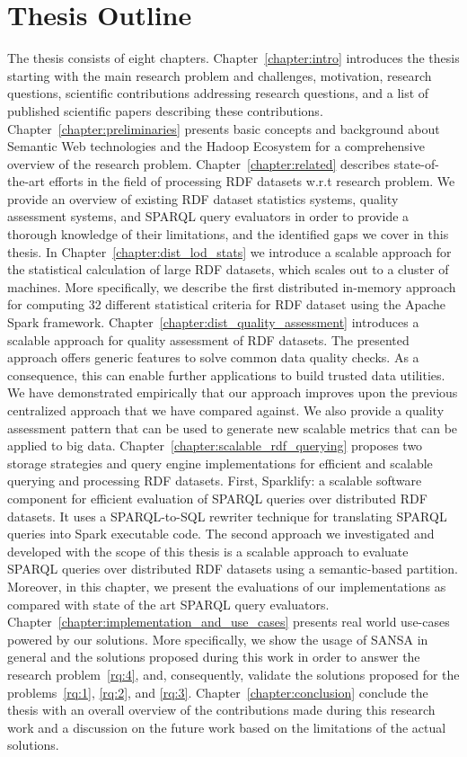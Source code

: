 \section{Thesis Outline}
\label{sec:thesis-outline}
The thesis consists of eight chapters.
Chapter~\ref{chapter:intro} introduces the thesis starting with the main research problem and challenges, motivation, research questions, scientific contributions addressing research questions, and a list of published scientific papers describing these contributions.
Chapter~\ref{chapter:preliminaries} presents basic concepts and background about Semantic Web technologies and the Hadoop Ecosystem for a comprehensive overview of the research problem. 
Chapter~\ref{chapter:related} describes state-of-the-art efforts in the field of processing \gls{RDF} datasets w.r.t research problem.
We provide an overview of existing \gls{RDF} dataset statistics systems, quality assessment systems, and \gls{SPARQL} query evaluators in order to provide a thorough knowledge of their limitations, and the identified gaps we cover in this thesis.
In Chapter~\ref{chapter:dist_lod_stats} we introduce a scalable approach for the statistical calculation of large \gls{RDF} datasets, which scales out to a cluster of machines.
More specifically, we describe the first distributed in-memory approach for computing 32 different statistical criteria for \gls{RDF} dataset using the Apache Spark framework.
Chapter~\ref{chapter:dist_quality_assessment} introduces a scalable approach for quality assessment of \gls{RDF} datasets.
The presented approach offers generic features to solve common data quality checks.
As a consequence, this can enable further applications to build trusted data utilities.
We have demonstrated empirically that our approach improves upon the previous centralized approach that we have compared against.
We also provide a quality assessment pattern that can be used to generate new scalable metrics that can be applied to big data.
Chapter~\ref{chapter:scalable_rdf_querying} proposes two storage strategies and query engine implementations for efficient and scalable querying and processing \gls{RDF} datasets.
First, Sparklify: a scalable software component for efficient evaluation of \gls{SPARQL} queries over distributed \gls{RDF} datasets. 
It uses a SPARQL-to-SQL rewriter technique for translating \gls{SPARQL} queries into Spark executable code.
The second approach we investigated and developed with the scope of this thesis is a scalable approach to evaluate \gls{SPARQL} queries over distributed \gls{RDF} datasets using a semantic-based partition.
Moreover, in this chapter, we present the evaluations of our implementations as compared with state of the art \gls{SPARQL} query evaluators.
Chapter~\ref{chapter:implementation_and_use_cases} presents real world use-cases powered by our solutions. 
More specifically, we show the usage of SANSA in general and the solutions proposed during this work in order to answer the research problem~\ref{rq:4}, and, consequently, validate the solutions proposed for the problems~\ref{rq:1}, \ref{rq:2}, and \ref{rq:3}.
Chapter~\ref{chapter:conclusion} conclude the thesis with an overall overview of the contributions made during this research work and a discussion on the future work based on the limitations of the actual solutions. 
